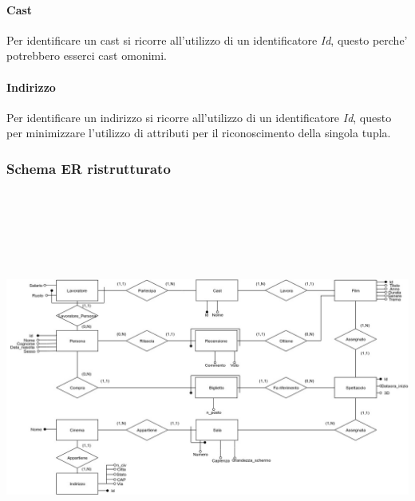 \documentclass[10pt]{article}
\begin{document}
	\paragraph{Cast}
	Per identificare un cast si ricorre all'utilizzo di un identificatore \textit{Id}, questo perche' potrebbero esserci cast omonimi.
	\paragraph{Indirizzo}
	Per identificare un indirizzo si ricorre all'utilizzo di un identificatore \textit{Id}, questo per minimizzare l'utilizzo di attributi per il riconoscimento della singola tupla.
	\subsubsection{Schema ER ristrutturato}	
	\includegraphics[width=\textwidth, height=13cm]{Schemas/SchemaER_Rev}
\end{document}
